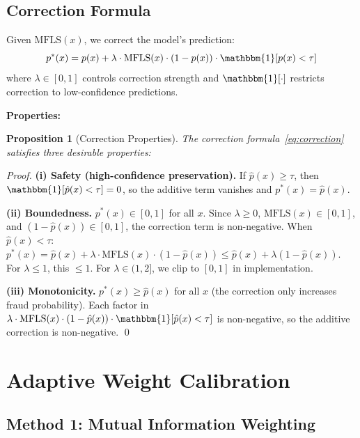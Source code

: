 \documentclass[journal]{IEEEtran}
\newcommand{\MFLS}{\mathrm{MFLS}}
\newcommand{\ind}{\mathbbm{1}}
\newtheorem{proposition}{Proposition}
\begin{document}
\subsection{Correction Formula}
\label{ssec:correction}

Given $\MFLS(x)$, we correct the model's prediction:
\begin{equation}
  p^*(x) = p(x) + \lambda \cdot \MFLS(x) \cdot (1 - p(x)) \cdot \ind[p(x) < \tau]
  \label{eq:correction}
\end{equation}
where $\lambda \in [0,1]$ controls correction strength and $\ind[\cdot]$ restricts correction to low-confidence predictions.

\textbf{Properties:}

\begin{proposition}[Correction Properties]
\label{prop:correction}
The correction formula~\eqref{eq:correction} satisfies three desirable properties:
\end{proposition}

\begin{proof}
\textbf{(i) Safety (high-confidence preservation).} If $\hat{p}(x) \geq \tau$, then $\ind[\hat{p}(x) < \tau] = 0$, so the additive term vanishes and $p^*(x) = \hat{p}(x)$.

\textbf{(ii) Boundedness.} $p^*(x) \in [0, 1]$ for all $x$. Since $\lambda \geq 0$, $\MFLS(x) \in [0,1]$, and $(1 - \hat{p}(x)) \in [0,1]$, the correction term is non-negative. When $\hat{p}(x) < \tau$: $p^*(x) = \hat{p}(x) + \lambda \cdot \MFLS(x) \cdot (1 - \hat{p}(x)) \leq \hat{p}(x) + \lambda(1 - \hat{p}(x))$. For $\lambda \leq 1$, this $\leq 1$. For $\lambda \in (1, 2]$, we clip to $[0,1]$ in implementation.

\textbf{(iii) Monotonicity.} $p^*(x) \geq \hat{p}(x)$ for all $x$ (the correction only increases fraud probability). Each factor in $\lambda \cdot \MFLS(x) \cdot (1 - \hat{p}(x)) \cdot \ind[\hat{p}(x) < \tau]$ is non-negative, so the additive correction is non-negative. \qed
\end{proof}

\section{Adaptive Weight Calibration}
\label{sec:adaptive}

\subsection{Method 1: Mutual Information Weighting}
\label{ssec:mi}
\end{document}
